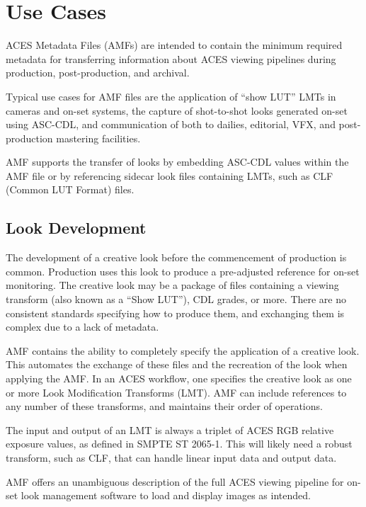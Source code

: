 \regularsectionformat	%
\chapter{Use Cases}
ACES Metadata Files (AMFs) are intended to contain the minimum required metadata for transferring information about ACES viewing pipelines during production, post-production, and archival.

Typical use cases for AMF files are the application of ``show LUT'' LMTs in cameras and on-set systems, the capture of shot-to-shot looks generated on-set using ASC-CDL, and communication of both to dailies, editorial, VFX, and post-production mastering facilities.

AMF supports the transfer of looks by embedding ASC-CDL values within the AMF file or by referencing sidecar look files containing LMTs, such as CLF (Common LUT Format) files.  

\section{Look Development}
The development of a creative look before the commencement of production is common. Production uses this look to produce a pre-adjusted reference for on-set monitoring. The creative look may be a package of files containing a viewing transform (also known as a “Show LUT”), CDL grades, or more. There are no consistent standards specifying how to produce them, and exchanging them is complex due to a lack of metadata.

AMF contains the ability to completely specify the application of a creative look. This automates the exchange of these files and the recreation of the look when applying the AMF. In an ACES workflow, one specifies the creative look as one or more Look Modification Transforms (LMT). AMF can include references to any number of these transforms, and maintains their order of operations.

The input and output of an LMT is always a triplet of ACES RGB relative exposure values, as defined in SMPTE ST 2065-1. This will likely need a robust transform, such as CLF, that can handle linear input data and output data.

AMF offers an unambiguous description of the full ACES viewing pipeline for on-set look management software to load and display images as intended.

